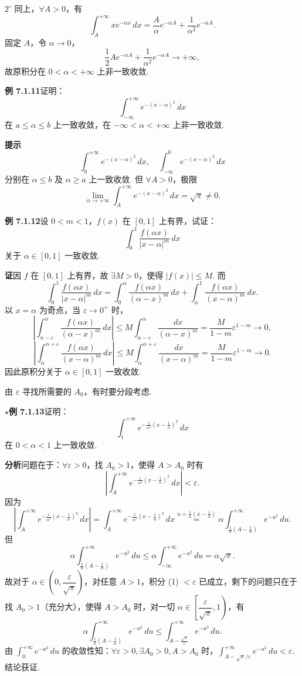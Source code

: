 \documentclass[UTF8,12pt,a4paper,fontset=fandol]{ctexart}
\begin{document}
$2^\circ$ 同上，$\forall A>0$，有
\[
\int_A^{+\infty}xe^{-\alpha x}\,dx
=\frac{A}{\alpha}e^{-\alpha A}+\frac1{\alpha^2}e^{-\alpha A}.
\]
固定 $A$，令 $\alpha\to0$，
\[
\frac12Ae^{-\alpha A}+\frac1{\alpha^2}e^{-\alpha A}\to+\infty,
\]
故原积分在 $0<\alpha<+\infty$ 上非一致收敛.

\noindent\textbf{例 7.1.11}\quad 证明：
\[
\int_{-\infty}^{+\infty}e^{-(x-\alpha)^2}\,dx
\]
在 $a\le\alpha\le b$ 上一致收敛，在 $-\infty<\alpha<+\infty$ 上非一致收敛.

\noindent\textbf{提示}\quad
\[
\int_0^{+\infty}e^{-(x-\alpha)^2}\,dx,\quad
\int_{-\infty}^0e^{-(x-\alpha)^2}\,dx
\]
分别在 $\alpha\le b$ 及 $\alpha\ge a$ 上一致收敛. 但 $\forall A>0$，极限
\[
\lim_{\alpha\to+\infty}\int_A^{+\infty}e^{-(x-\alpha)^2}\,dx=\sqrt\pi\ne0.
\]

\noindent\textbf{例 7.1.12}\quad 设 $0<m<1$，$f(x)$ 在 $[0,1]$ 上有界，试证：
\[
\int_0^1\frac{f(\alpha x)}{|x-\alpha|^m}\,dx
\]
关于 $\alpha\in[0,1]$ 一致收敛.

\noindent\textbf{证}\quad 因 $f$ 在 $[0,1]$ 上有界，故 $\exists M>0$，使得 $|f(x)|\le M$. 而
\[
\int_0^1\frac{f(\alpha x)}{|x-\alpha|^m}\,dx
=\int_0^\alpha\frac{f(\alpha x)}{(\alpha-x)^m}\,dx
+\int_\alpha^1\frac{f(\alpha x)}{(x-\alpha)^m}\,dx.
\]
以 $x=\alpha$ 为奇点，当 $\varepsilon\to0^+$ 时，
\[
\left|\int_{\alpha-\varepsilon}^{\alpha}\frac{f(\alpha x)}{(\alpha-x)^m}\,dx\right|
\le M\int_{\alpha-\varepsilon}^{\alpha}\frac{dx}{(\alpha-x)^m}
=\frac{M}{1-m}\varepsilon^{1-m}\to0,
\]
\[
\left|\int_{\alpha}^{\alpha+\varepsilon}\frac{f(\alpha x)}{(x-\alpha)^m}\,dx\right|
\le M\int_{\alpha}^{\alpha+\varepsilon}\frac{dx}{(x-\alpha)^m}
=\frac{M}{1-m}\varepsilon^{1-m}\to0.
\]
因此原积分关于 $\alpha\in[0,1]$ 一致收敛.

由 $\varepsilon$ 寻找所需要的 $A_0$，有时要分段考虑.

\noindent\textbf{$\star$例 7.1.13}\quad 证明：
\[
\int_1^{+\infty}e^{-\frac1{\alpha^2}\left(x-\frac1\alpha\right)^2}\,dx
\]
在 $0<\alpha<1$ 上一致收敛.

\noindent\textbf{分析}\quad 问题在于：$\forall\varepsilon>0$，找 $A_0>1$，使得 $A>A_0$ 时有
\[
\left|\int_A^{+\infty}e^{-\frac1{\alpha^2}\left(x-\frac1\alpha\right)^2}\,dx\right|<\varepsilon.
\]
因为
\[
\left|\int_A^{+\infty}e^{-\frac1{\alpha^2}\left(x-\frac1\alpha\right)^2}\,dx\right|
=\int_A^{+\infty}e^{-\frac1{\alpha^2}\left(x-\frac1\alpha\right)^2}\,dx
\stackrel{u=\frac1\alpha(x-\frac1\alpha)}{=}
\alpha\int_{\frac1\alpha(A-\frac1\alpha)}^{+\infty}e^{-u^2}\,du.
\tag{1}
\]
但
\[
\alpha\int_{\frac1\alpha(A-\frac1\alpha)}^{+\infty}e^{-u^2}\,du
\le \alpha\int_{-\infty}^{+\infty}e^{-u^2}\,du
=\alpha\sqrt\pi.
\]
故对于 $\alpha\in\left(0,\dfrac{\varepsilon}{\sqrt\pi}\right)$，对任意 $A>1$，积分 (1) $<\varepsilon$ 已成立，剩下的问题只在于找 $A_0>1$（充分大），使得 $A>A_0$ 时，对一切 $\alpha\in\left[\dfrac{\varepsilon}{\sqrt\pi},1\right)$，有
\[
\alpha\int_{\frac1\alpha(A-\frac1\alpha)}^{+\infty}e^{-u^2}\,du
\le\int_{A-\frac{\sqrt\pi}{\varepsilon}}^{+\infty}e^{-u^2}\,du.
\tag{2}
\]
由 $\displaystyle\int_0^{+\infty}e^{-u^2}\,du$ 的收敛性知：$\forall\varepsilon>0,\exists A_0>0,A>A_0$ 时，$\displaystyle\int_{A-\sqrt\pi/\varepsilon}^{+\infty}e^{-u^2}\,du<\varepsilon$. 结论获证.
\end{document}
